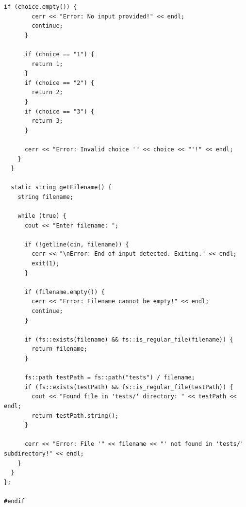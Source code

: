 \begin{lstlisting}[caption=Файл \texttt{input.h}]
      if (choice.empty()) {
        cerr << "Error: No input provided!" << endl;
        continue;
      }

      if (choice == "1") {
        return 1;
      }
      if (choice == "2") {
        return 2;
      }
      if (choice == "3") {
        return 3;
      }

      cerr << "Error: Invalid choice '" << choice << "'!" << endl;
    }
  }

  static string getFilename() {
    string filename;

    while (true) {
      cout << "Enter filename: ";

      if (!getline(cin, filename)) {
        cerr << "\nError: End of input detected. Exiting." << endl;
        exit(1);
      }

      if (filename.empty()) {
        cerr << "Error: Filename cannot be empty!" << endl;
        continue;
      }

      if (fs::exists(filename) && fs::is_regular_file(filename)) {
        return filename;
      }

      fs::path testPath = fs::path("tests") / filename;
      if (fs::exists(testPath) && fs::is_regular_file(testPath)) {
        cout << "Found file in 'tests/' directory: " << testPath << endl;
        return testPath.string();
      }

      cerr << "Error: File '" << filename << "' not found in 'tests/' subdirectory!" << endl;
    }
  }
};

#endif
\end{lstlisting}